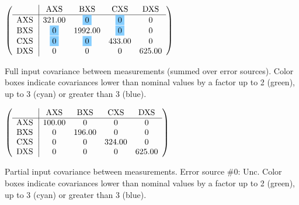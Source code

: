 \begin{table}[H]
\scriptsize
\begin{center}
\renewcommand{\arraystretch}{1.1}
\begin{math}\left(\begin{array}{c|cccc}
 & \mathrm{AXS} & 
\mathrm{BXS} & 
\mathrm{CXS} & 
\mathrm{DXS} \\
\hline
\mathrm{AXS} \hspace*{2pt} &     321.00 &  \colorbox{SkyBlue1}{$ 0$} &  \colorbox{SkyBlue1}{$ 0$} &  0 \\
\mathrm{BXS} \hspace*{2pt} &  \colorbox{SkyBlue1}{$ 0$} &    1992.00 &  \colorbox{SkyBlue1}{$ 0$} &  0 \\
\mathrm{CXS} \hspace*{2pt} &  \colorbox{SkyBlue1}{$ 0$} &  \colorbox{SkyBlue1}{$ 0$} &     433.00 &  0 \\
\mathrm{DXS} \hspace*{2pt} &  0 &  0 &  0 &     625.00 \\
\end{array}\right)\end{math}
\caption{Full input covariance between measurements (summed over error sources). Color boxes indicate covariances lower than nominal values by a factor up to 2 (green), up to 3 (cyan) or greater than 3 (blue).}
\renewcommand{\arraystretch}{1}
\end{center}
\end{table}
\begin{table}[H]
\scriptsize
\begin{center}
\renewcommand{\arraystretch}{1.1}
\begin{math}\left(\begin{array}{c|cccc}
 & \mathrm{AXS} & 
\mathrm{BXS} & 
\mathrm{CXS} & 
\mathrm{DXS} \\
\hline
\mathrm{AXS} \hspace*{2pt} &     100.00 &  0 &  0 &  0 \\
\mathrm{BXS} \hspace*{2pt} &  0 &     196.00 &  0 &  0 \\
\mathrm{CXS} \hspace*{2pt} &  0 &  0 &     324.00 &  0 \\
\mathrm{DXS} \hspace*{2pt} &  0 &  0 &  0 &     625.00 \\
\end{array}\right)\end{math}
\caption{Partial input covariance between measurements. Error source \#0: Unc. Color boxes indicate covariances lower than nominal values by a factor up to 2 (green), up to 3 (cyan) or greater than 3 (blue).}
\renewcommand{\arraystretch}{1}
\end{center}
\end{table}
